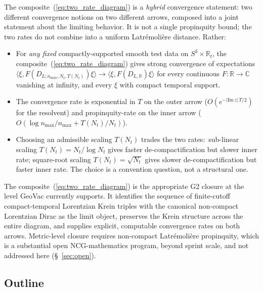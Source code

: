 \documentclass[11pt,a4paper]{article}
\theoremstyle{plain}
\theoremstyle{definition}
\newcommand{\nmax}{n_{\max}}
\newcommand{\Nt}{N_{t}}
\newcommand{\Manifoldlim}{S^{3}\times \mathbb{R}_{t}}
\newcommand{\R}{\mathbb{R}}
\newcommand{\C}{\mathbb{C}}
\newcommand{\DLR}{D_{L,\R}}
\begin{document}
The composite~(\ref{eq:two_rate_diagram}) is a \emph{hybrid}
convergence statement: two different convergence notions on two
different arrows, composed into a joint statement about the limiting
behavior. It is not a single propinquity bound; the two rates do not
combine into a uniform Latr\'emoli\`ere distance. Rather:
\begin{itemize}
\item For \emph{any fixed} compactly-supported smooth test data on
$\Manifoldlim$, the composite~(\ref{eq:two_rate_diagram}) gives
strong convergence of expectations
$\langle \xi, F(D_{L;\nmax,\Nt,T(\Nt)}) \xi \rangle
\to \langle \xi, F(\DLR) \xi\rangle$ for every continuous
$F : \R \to \C$ vanishing at infinity, and every $\xi$ with compact
temporal support.
\item The convergence rate is exponential in $T$ on the outer arrow
($O(e^{-|\mathrm{Im}\,z|\,T/2})$ for the resolvent) and propinquity-rate
on the inner arrow ($O(\log\nmax/\nmax + T(\Nt)/\Nt)$).
\item Choosing an admissible scaling $T(\Nt)$ trades the two rates:\
sub-linear scaling $T(\Nt) = \Nt/\log\Nt$ gives faster
de-compactification but slower inner rate; square-root scaling
$T(\Nt) = \sqrt{\Nt}$ gives slower de-compactification but faster
inner rate. The choice is a convention question, not a structural one.
\end{itemize}

The composite~(\ref{eq:two_rate_diagram}) is the appropriate G2
closure at the level GeoVac currently supports. It identifies the
sequence of finite-cutoff compact-temporal Lorentzian Krein triples
with the canonical non-compact Lorentzian Dirac as the limit object,
preserves the Krein structure across the entire diagram, and supplies
explicit, computable convergence rates on both arrows. Metric-level
closure requires non-compact Latr\'emoli\`ere propinquity, which is a
substantial open NCG-mathematics program, beyond sprint scale, and not
addressed here (\S~\ref{sec:open}).

\subsection{Outline}\label{sec:outline}
\end{document}
